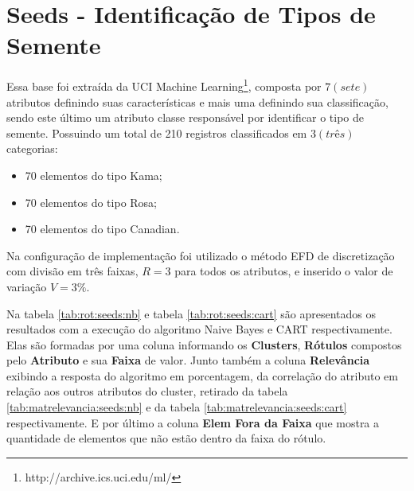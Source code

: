 \section{Seeds - Identificação de Tipos de Semente}
Essa base foi extraída da UCI Machine Learning\footnote{http://archive.ics.uci.edu/ml/}, composta por ${7(sete)}$ atributos definindo suas características e mais uma definindo sua classificação, sendo este último um atributo classe  responsável por identificar o tipo de semente. Possuindo um total de 210 registros classificados em ${3(três)}$ categorias:
\begin{itemize}[noitemsep]
 \item 70 elementos do tipo Kama;
 \item 70 elementos do tipo Rosa;
 \item 70 elementos do tipo Canadian.
\end{itemize}
Na configuração de implementação foi utilizado o método EFD de discretização com divisão em três faixas, ${R=3}$ para todos os atributos, e inserido o valor de variação ${V=3\%}$.

Na tabela \ref{tab:rot:seeds:nb} e tabela \ref{tab:rot:seeds:cart} são  apresentados os resultados com a execução do algoritmo Naive Bayes e CART respectivamente. Elas são formadas por uma coluna informando os \textbf{Clusters}, \textbf{Rótulos}  compostos pelo \textbf{Atributo} e sua \textbf{Faixa} de valor. Junto também a coluna \textbf{Relevância} exibindo a resposta do algoritmo em porcentagem, da correlação do atributo em relação aos outros atributos do cluster, retirado da tabela \ref{tab:matrelevancia:seeds:nb} e da tabela \ref{tab:matrelevancia:seeds:cart} respectivamente. E por último a coluna \textbf{Elem Fora da Faixa} que mostra a quantidade de elementos que não estão dentro da faixa do rótulo.

